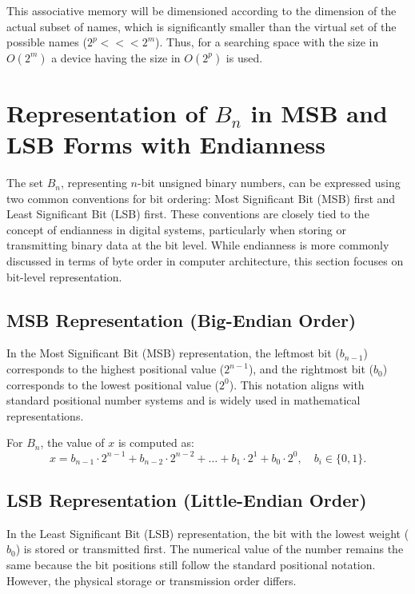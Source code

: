 This associative memory will be dimensioned according to the
dimension of the actual subset of names, which is significantly
smaller than the virtual set of the possible names ($2^{p} <<<
2^{m}$). Thus, for a searching space with the size in $O(2^{m})$ a
device having the size in $O(2^{p})$ is used.






\section{Representation of \( B_n \) in MSB and LSB Forms with Endianness}
The set \( B_n \), representing \( n \)-bit unsigned binary numbers, can be expressed using two common conventions for bit ordering: Most Significant Bit (MSB) first and Least Significant Bit (LSB) first. These conventions are closely tied to the concept of endianness in digital systems, particularly when storing or transmitting binary data at the bit level. While endianness is more commonly discussed in terms of byte order in computer architecture, this section focuses on bit-level representation.

\subsection{MSB Representation (Big-Endian Order)}
In the Most Significant Bit (MSB) representation, the leftmost bit (\( b_{n-1} \)) corresponds to the highest positional value (\( 2^{n-1} \)), and the rightmost bit (\( b_0 \)) corresponds to the lowest positional value (\( 2^0 \)). This notation aligns with standard positional number systems and is widely used in mathematical representations.

For \( B_n \), the value of \( x \) is computed as:
\[
x = b_{n-1} \cdot 2^{n-1} + b_{n-2} \cdot 2^{n-2} + \dots + b_1 \cdot 2^1 + b_0 \cdot 2^0, \quad b_i \in \{0, 1\}.
\]

\subsection{LSB Representation (Little-Endian Order)}
In the Least Significant Bit (LSB) representation, the bit with the lowest weight (\( b_0 \)) is stored or transmitted first. The numerical value of the number remains the same because the bit positions still follow the standard positional notation. However, the physical storage or transmission order differs.

